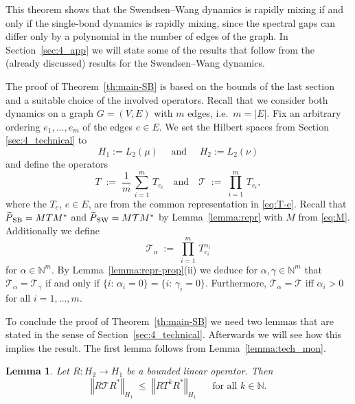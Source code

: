 \documentclass{dis}
\newtheorem{lemma}[theorem]{Lemma}
\theoremstyle{citing}
\begin{document}
This theorem shows that the Swendsen--Wang dynamics is rapidly mixing 
if and only if the single-bond dynamics is rapidly mixing, 
since the spectral gaps can differ only by a polynomial in the 
number of edges of the graph.
In Section~\ref{sec:4_app} we will state some of the results that 
follow from the (already discussed) results for the Swendsen--Wang 
dynamics.

The proof of Theorem~\ref{th:main-SB} is based on the bounds of 
the last section and a suitable choice of the 
involved operators.
Recall that we consider both dynamics on a graph $G=(V,E)$ with 
$m$ edges, i.e.~$m={\left\vert {E} \right\vert}$. 
Fix an arbitrary ordering $e_1,\dots,e_m$ of the edges $e\in E$. 
We set the Hilbert spaces from Section \ref{sec:4_technical} to 
\[
{H_1}:=L_2(\mu) \quad \text{ and }\quad  {H_2}:=L_2(\nu)
\] 
and define the operators 
\begin{equation*} 
T \;:=\; \frac{1}{m}\,\sum_{i=1}^m\, T_{e_i}
\quad
\mbox{and}\quad
{\mathcal{T}} \;:=\; \prod_{i=1}^m\, T_{e_i},
\end{equation*}
where the $T_e$, $e\in E$, are 
from the common representation in 
\eqref{eq:T-e}. 
Recall that ${{\raisebox{2pt}{ ${\widetilde{{}}}$ }\mkern-14mu P}_{\rm SB}}=M T M^*$ and ${{\raisebox{2pt}{ ${\widetilde{{}}}$ }\mkern-14mu P}_{\rm SW}}=M {\mathcal{T}} M^*$ 
by Lemma~\ref{lemma:repr} with $M$ from \eqref{eq:M}.
Additionally we define
\begin{equation*} 
{\mathcal{T}}_{\alpha} \;:=\; \prod_{i=1}^m\, T_{e_i}^{{\alpha}_i}
\end{equation*}
for ${\alpha}\in{\ensuremath{\mathbb{N}}}^m$. By Lemma~\ref{lemma:repr-prop}(ii) we deduce for 
${\alpha}, {\gamma}\in{\ensuremath{\mathbb{N}}}^m$ that 
${\mathcal{T}}_{\alpha}={\mathcal{T}}_{\gamma}$ if and only if $\{i:\,{\alpha}_i=0\}=\{i:\,{\gamma}_i=0\}$. 
Furthermore, ${\mathcal{T}}_{\alpha}={\mathcal{T}}$ iff ${\alpha}_i>0$ for all 
$i=1,\dots,m$.  

To conclude the proof of Theorem~\ref{th:main-SB} we 
need two lemmas that are stated in the sense of 
Section~\ref{sec:4_technical}. 
Afterwards we will see how this implies the result. 
The first lemma follows from Lemma~\ref{lemma:tech_mon}.

\begin{lemma}\label{lemma:norm1}
Let $R:{H_2}\to {H_1}$ be a bounded linear operator. 
Then
\[
{\left\Vert {R {\mathcal{T}} R^*} \right\Vert}_{H_1} \;\le\; {\left\Vert {R T^k R^*} \right\Vert}_{H_1}
\; \quad \text{ for all } k\in{\ensuremath{\mathbb{N}}}.
\]
\end{lemma}
\end{document}
